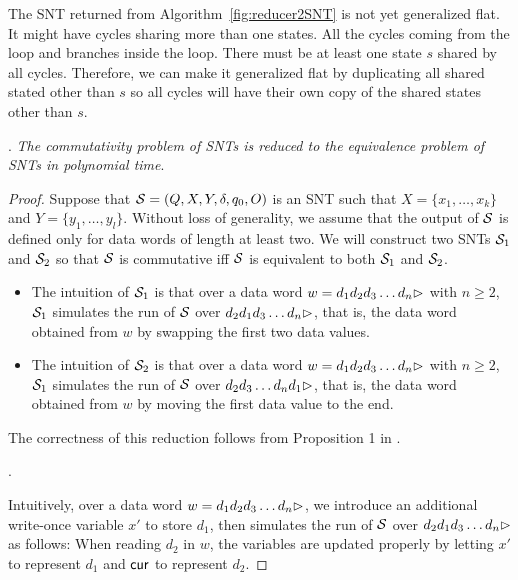 \begin{appendix}
{The SNT returned from Algorithm~\ref{fig:reducer2SNT} is not yet generalized flat. It might have cycles sharing more than one states. All the cycles coming from the loop and branches inside the loop. There must be at least one state $s$ shared by all cycles. Therefore, we can make it generalized flat by duplicating all shared stated other than $s$ so all cycles will have their own copy of the shared states other than $s$.  
}

\vspace{4mm}

. 
\emph{The commutativity problem of SNTs is reduced to the equivalence problem of SNTs in polynomial time}.

\begin{proof}
Suppose that ${\mathcal{S} }=(Q, X, Y, \delta, q_0, O)$ is an SNT such that $X=\{x_1,\dots,x_k\}$ and $Y=\{y_1,\dots,y_l\}$. Without loss of generality, we assume that the output of ${\mathcal{S} }$ is defined only for data words of length at least two. We will construct two SNTs ${\mathcal{S} }_1$ and ${\mathcal{S} }_2$ so that ${\mathcal{S} }$ is commutative iff ${\mathcal{S} }$ is equivalent to both ${\mathcal{S} }_1$ and ${\mathcal{S} }_2$.
\begin{itemize}
\item The intuition of ${\mathcal{S} }_1$ is that over a data word $w=d_1 d_2 d_3 \dots d_n\rhd$ with $n\ge 2$, ${\mathcal{S} }_1$ simulates the run of ${\mathcal{S} }$ over $d_2 d_1 d_3 \dots d_n\rhd$, that is, the data word obtained from $w$ by swapping the first two data values.
%
\item The intuition of ${\mathcal{S} }_2$ is that over a data word $w=d_1 d_2 d_3 \dots d_n\rhd$ with $n\ge 2$, ${\mathcal{S} }_1$ simulates the run of ${\mathcal{S} }$ over $d_2 d_3 \dots d_n d_1\rhd$, that is, the data word obtained from $w$ by moving the first data value to the end. 
\end{itemize}
The correctness of this reduction follows from Proposition 1 in \cite{CHSW15}.

\smallskip

.

Intuitively, over a data word $w=d_1d_2 d_3 \dots d_n\rhd$, we introduce an additional write-once variable $x'$ to store $d_1$, then simulates the run of ${\mathcal{S} }$ over $d_2 d_1 d_3 \dots d_n\rhd$ as follows: When reading $d_2$ in $w$, the variables are updated properly by letting $x'$ to represent $d_1$ and $\mathsf{cur}$ to represent $d_2$.




\end{proof}
\end{appendix}
